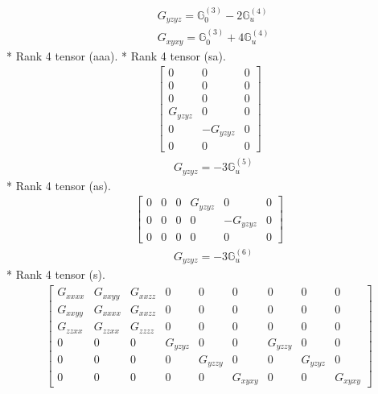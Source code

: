 \documentclass[fleqn,8pt,landscape]{jsarticle}
\begin{document}
\begin{align*}
& G_{yzyz} = \mathbb{G}_{0}^{(3)} - 2 \mathbb{G}_{u}^{(4)} \\
& G_{xyxy} = \mathbb{G}_{0}^{(3)} + 4 \mathbb{G}_{u}^{(4)}
\end{align*}
* Rank 4 tensor (aaa).
* Rank 4 tensor (sa).
\begin{align*}
\begin{bmatrix} 0 & 0 & 0 \\ 0 & 0 & 0 \\ 0 & 0 & 0 \\ G_{yzyz} & 0 & 0 \\ 0 & - G_{yzyz} & 0 \\ 0 & 0 & 0 \end{bmatrix}
\end{align*}
\begin{align*}
& G_{yzyz} = - 3 \mathbb{G}_{u}^{(5)}
\end{align*}
* Rank 4 tensor (as).
\begin{align*}
\begin{bmatrix} 0 & 0 & 0 & G_{yzyz} & 0 & 0 \\ 0 & 0 & 0 & 0 & - G_{yzyz} & 0 \\ 0 & 0 & 0 & 0 & 0 & 0 \end{bmatrix}
\end{align*}
\begin{align*}
& G_{yzyz} = - 3 \mathbb{G}_{u}^{(6)}
\end{align*}
* Rank 4 tensor (s).
\begin{align*}
\begin{bmatrix} G_{xxxx} & G_{xxyy} & G_{xxzz} & 0 & 0 & 0 & 0 & 0 & 0 \\ G_{xxyy} & G_{xxxx} & G_{xxzz} & 0 & 0 & 0 & 0 & 0 & 0 \\ G_{zzxx} & G_{zzxx} & G_{zzzz} & 0 & 0 & 0 & 0 & 0 & 0 \\ 0 & 0 & 0 & G_{yzyz} & 0 & 0 & G_{yzzy} & 0 & 0 \\ 0 & 0 & 0 & 0 & G_{yzzy} & 0 & 0 & G_{yzyz} & 0 \\ 0 & 0 & 0 & 0 & 0 & G_{xyxy} & 0 & 0 & G_{xyxy} \end{bmatrix}
\end{align*}
\end{document}

